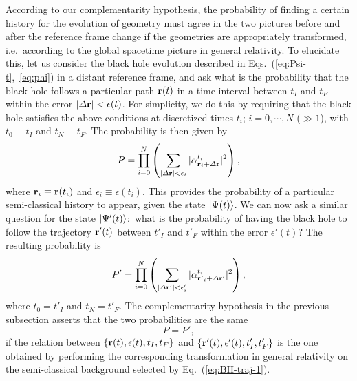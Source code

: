 \documentclass[12pt]{article}
\begin{document}
According to our complementarity hypothesis, the probability of finding 
a certain history for the evolution of geometry must agree in the two 
pictures before and after the reference frame change if the geometries 
are appropriately transformed, i.e.\ according to the global spacetime 
picture in general relativity.  To elucidate this, let us consider the 
black hole evolution described in Eqs.~(\ref{eq:Psi-t},~\ref{eq:phi}) in 
a distant reference frame, and ask what is the probability that the black 
hole follows a particular path ${\bf r}(t)$ in a time interval between 
$t_I$ and $t_F$ within the error $|\varDelta {\bf r}| < \epsilon(t)$. 
For simplicity, we do this by requiring that the black hole satisfies the 
above conditions at discretized times $t_i$; $i=0,\cdots,N$ ($\gg 1$), 
with $t_0 \equiv t_I$ and $t_N \equiv t_F$.  The probability is then 
given by
%
\begin{equation}
  P = \prod_{i=0}^{N}
    \left( \sum_{|\varDelta {\bf r}| < \epsilon_i} 
      |\alpha^{t_i}_{{\bf r}_i + \varDelta{\bf r}}|^2 \right),
\label{eq:BH-traj-1}
\end{equation}
%
where ${\bf r}_i \equiv {\bf r}(t_i)$ and $\epsilon_i \equiv \epsilon(t_i)$. 
This provides the probability of a particular semi-classical history to 
appear, given the state $\left| \Psi(t) \right>$.  We can now ask a similar question 
for the state $\left| \Psi'(t) \right>$:\ what is the probability of having the 
black hole to follow the trajectory ${\bf r'}(t)$ between $t'_I$ and $t'_F$ 
within the error $\epsilon'(t)$?  The resulting probability is
%
\begin{equation}
  P' = \prod_{i=0}^{N}
    \left( \sum_{|\varDelta {\bf r'}| < \epsilon'_i} 
      |\alpha^{t_i}_{{\bf r'}_i + \varDelta{\bf r'}}|^2 \right),
\label{eq:BH-traj-2}
\end{equation}
%
where $t_0 = t'_I$ and $t_N = t'_F$.  The complementarity hypothesis in 
the previous subsection asserts that the two probabilities are the same
%
\begin{equation}
  P = P',
\label{eq:P=P'}
\end{equation}
%
if the relation between $\{ {\bf r}(t), \epsilon(t), t_I, t_F \}$ and 
$\{ {\bf r'}(t), \epsilon'(t), t'_I, t'_F \}$ is the one obtained by 
performing the corresponding transformation in general relativity on 
the semi-classical background selected by Eq.~(\ref{eq:BH-traj-1}).
\end{document}
